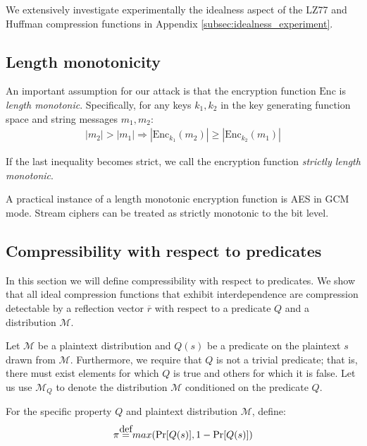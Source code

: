 We extensively investigate experimentally the idealness aspect of the LZ77 and
Huffman compression functions in Appendix \ref{subsec:idealness_experiment}.

\subsection{Length monotonicity}\label{subsec:lenmonotone}

An important assumption for our attack is that the encryption function
$\textrm{Enc}$ is \textit{length monotonic}. Specifically, for any keys $k_1,
k_2$ in the key generating function space and string messages $m_1, m_2$:
\begin{equation*}
\begin{split}
|m_2| > |m_1|
\Rightarrow
|\textrm{Enc}_{k_1}(m_2)| \geq |\textrm{Enc}_{k_2}(m_1)|
\end{split}
\end{equation*}

If the last inequality becomes strict, we call the encryption function
\textit{strictly length monotonic}.

A practical instance of a length monotonic encryption function is AES in GCM
mode. Stream ciphers can be treated as strictly monotonic to the bit level.

\subsection{Compressibility with respect to predicates}\label{subsec:propertycom}
In this section we will define compressibility with respect to predicates. We
show that all ideal compression functions that exhibit interdependence are
compression detectable by a reflection vector $\overbar{r}$ with respect to a
predicate $Q$ and a distribution $\mathcal{M}$.

Let $\mathcal{M}$ be a plaintext distribution and $Q(s)$ be a predicate on the
plaintext $s$ drawn from $\mathcal{M}$. Furthermore, we require that $Q$ is not a
trivial predicate; that is, there must exist elements for which $Q$ is true and
others for which it is false. Let us use $\mathcal{M}_Q$ to denote the
distribution $\mathcal{M}$ conditioned on the predicate $Q$.

For the specific property $Q$ and plaintext distribution $\mathcal{M}$, define:
\begin{equation*}
    \pi \defeq max(\Pr[Q(s)], 1 - \Pr[Q(s)])
\end{equation*}

